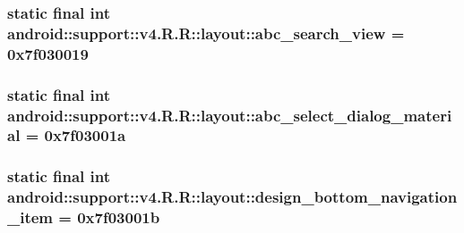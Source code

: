 \hypertarget{classandroid_1_1support_1_1v4_1_1_r_1_1layout_15307e1c272180f82596978ec4be070f}{
\subsubsection[{abc\_\-search\_\-view}]{\setlength{\rightskip}{0pt plus 5cm}static final int android::support::v4.R.R::layout::abc\_\-search\_\-view = 0x7f030019}}
\label{classandroid_1_1support_1_1v4_1_1_r_1_1layout_15307e1c272180f82596978ec4be070f}


\hypertarget{classandroid_1_1support_1_1v4_1_1_r_1_1layout_9e7288da73c871d07f1588164ae469f5}{
\subsubsection[{abc\_\-select\_\-dialog\_\-material}]{\setlength{\rightskip}{0pt plus 5cm}static final int android::support::v4.R.R::layout::abc\_\-select\_\-dialog\_\-material = 0x7f03001a}}
\label{classandroid_1_1support_1_1v4_1_1_r_1_1layout_9e7288da73c871d07f1588164ae469f5}


\hypertarget{classandroid_1_1support_1_1v4_1_1_r_1_1layout_428d34d08f8b0a19126b5b0837c8ae74}{
\subsubsection[{design\_\-bottom\_\-navigation\_\-item}]{\setlength{\rightskip}{0pt plus 5cm}static final int android::support::v4.R.R::layout::design\_\-bottom\_\-navigation\_\-item = 0x7f03001b}}
\label{classandroid_1_1support_1_1v4_1_1_r_1_1layout_428d34d08f8b0a19126b5b0837c8ae74}


